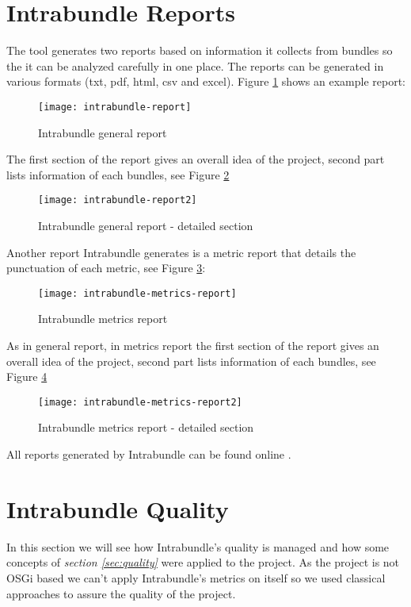 \section{Intrabundle Reports}
\label{sec:intrabundle-reports}
The tool generates two reports based on information it collects from bundles so the it can be analyzed carefully in one place. The reports can be generated in various formats (txt, pdf, html, csv and excel). Figure \ref{intrabundle-report1} shows an example report:  

\begin{figure}[h]
\caption{Intrabundle general report}
\label{intrabundle-report1}
\centering
\texttt{[image: intrabundle-report]}
\end{figure}  
\FloatBarrier

The first section of the report gives an overall idea of the project, second part lists information of each bundles, see Figure \ref{intrabundle-report2} 

\begin{figure}[h]
\caption{Intrabundle general report - detailed section }
\label{intrabundle-report2}
\centering
\texttt{[image: intrabundle-report2]}
\end{figure}  
\FloatBarrier

Another report Intrabundle generates is a metric report that details the punctuation of each metric, see Figure \ref{intrabundle-metrics-report}:  

\begin{figure}[h]
\caption{Intrabundle metrics report}
\label{intrabundle-metrics-report}
\centering
\texttt{[image: intrabundle-metrics-report]}
\end{figure}  
\FloatBarrier

As in general report, in metrics report the first section of the report gives an overall idea of the project, second part lists information of each bundles, see Figure \ref{intrabundle-metrics-report2} 

\begin{figure}[h]
\caption{Intrabundle metrics report - detailed section}
\label{intrabundle-metrics-report2}
\centering
\texttt{[image: intrabundle-metrics-report2]}
\end{figure}  
\FloatBarrier

All reports generated by Intrabundle can be found online \citep{intrabundle reports 2014}.

\section{Intrabundle Quality}
In this section we will see how Intrabundle's quality is managed and how some concepts of \textit{section \ref{sec:quality}} were applied to the project. As the project is not OSGi based we can't apply Intrabundle's metrics on itself so we used classical approaches to assure the quality of the project.

